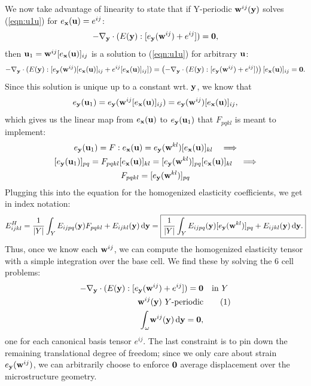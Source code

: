\documentclass[10pt]{article}
\newcommand\numberthis{\addtocounter{equation}{1}\tag{\theequation}}
\begin{document}
We now take advantage of linearity to state that if Y-periodic ${\bf
w}^{ij}({\bf y})$ solves (\ref{eqn:u1u}) for $e_{\bf x}({\bf u}) = e^{ij}$:
\begin{equation}
-\nabla_{\bf y} \cdot (E({\bf y}) : [e_{\bf y}({\bf w}^{ij}) + e^{ij}]) = {\bf 0},
\end{equation}
then ${\bf u}_1 = {\bf w}^{ij} [e_{\bf x}({\bf u})]_{ij}$ is a solution to
(\ref{eqn:u1u}) for arbitrary ${\bf u}$:
$$
-\nabla_{\bf y} \cdot (E({\bf y}) : [e_{\bf y}({\bf w}^{ij})[e_{\bf x}({\bf u})]_{ij} + e^{ij}[e_{\bf x}({\bf u})]_{ij}]) =
\left(-\nabla_{\bf y} \cdot (E({\bf y}) : [e_{\bf y}({\bf w}^{ij}) + e^{ij}]) \right)[e_{\bf x}({\bf u})]_{ij} = {\bf 0}.
$$
Since this solution is unique up to a constant wrt. ${\bf y}$, we know that
$$
e_{\bf y}({\bf u}_1) = e_{\bf y}({\bf w}^{ij} [e_{\bf x}({\bf u})]_{ij}) = e_{\bf y}({\bf w}^{ij})[e_{\bf x}({\bf u})]_{ij},
$$
which gives us the linear map from $e_{\bf x}({\bf u})$ to $e_{\bf y}({\bf u}_1)$
that $F_{pqkl}$ is meant to implement:
\begin{gather*}
e_{\bf y}({\bf u}_1) = F : e_{\bf x}({\bf u}) = e_{\bf y}({\bf w}^{kl})[e_{\bf x}({\bf u})]_{kl} \quad \Longrightarrow \\
[e_{\bf y}({\bf u}_1)]_{pq} = F_{pqkl} [e_{\bf x}({\bf u})]_{kl} = [e_{\bf y}({\bf w}^{kl})]_{pq}[e_{\bf x}({\bf u})]_{kl} \quad \Longrightarrow \\
F_{pqkl} = [e_{\bf y}({\bf w}^{kl})]_{pq}
\end{gather*}
Plugging this into the equation for the homogenized elasticity coefficients, we get in index notation:
\begin{equation}
    \label{eqn:Eh}
E^H_{ijkl} = \frac{1}{|Y|} \int_Y E_{ijpq}({\bf y}) F_{pqkl} + E_{ijkl}({\bf y}) \, \mathrm{d} {\bf y}
= \boxed{\frac{1}{|Y|} \int_Y E_{ijpq}({\bf y}) [e_{\bf y}({\bf w}^{kl})]_{pq} + E_{ijkl}({\bf y}) \, \mathrm{d} {\bf y}.}
\end{equation}
Thus, once we know each ${\bf w}^{ij}$, we can compute the homogenized elasticity tensor
with a simple integration over the base cell. We find these by solving the 6 cell problems:
\begin{align*}
    -\nabla_{\bf y} \cdot (E({\bf y}) : [e_{\bf y}({\bf w}^{ij}) + e^{ij}]) = {\bf 0} & \quad \text{in } Y \\
    {\bf w}^{ij}({\bf y})\ Y \text{-periodic} &     \numberthis \label{eqn:cell} \\
    \int_\omega \! {\bf w}^{ij}({\bf y})  \, \mathrm{d} {\bf y} =  {\bf 0}, 
\end{align*}
one for each canonical basis tensor $e^{ij}$. The last constraint is to pin
down the remaining translational degree of freedom; since we only care about
strain $e_{\bf y}({\bf w}^{ij})$, we can arbitrarily choose to enforce ${\bf
0}$ average displacement over the microstructure geometry.
\end{document}
